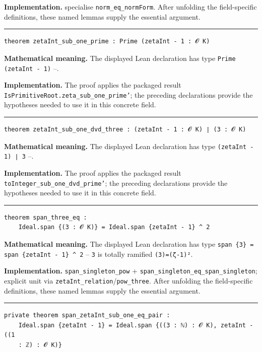 \documentclass[UTF8,a4paper,11pt,fontset=fandol]{ctexart}
\theoremstyle{definition}
\newcommand{\statementsep}{\par\medskip\hrule\medskip}
\begin{document}
\noindent\textbf{Implementation.} specialise \texttt{norm\_\allowbreak{}eq\_\allowbreak{}normForm}. After unfolding the field-specific definitions, these named lemmas supply the essential argument.\par
\statementsep
\begin{verbatim}
theorem zetaInt_sub_one_prime : Prime (zetaInt - 1 : 𝓞 K)
\end{verbatim}
\noindent\textbf{Mathematical meaning.} The displayed Lean declaration has type \texttt{Prime (zetaInt - 1)} --.\par
\noindent\textbf{Implementation.} The proof applies the packaged result \texttt{IsPrimitiveRoot.\allowbreak{}zeta\_\allowbreak{}sub\_\allowbreak{}one\_\allowbreak{}prime'}; the preceding declarations provide the hypotheses needed to use it in this concrete field.\par
\statementsep
\begin{verbatim}
theorem zetaInt_sub_one_dvd_three : (zetaInt - 1 : 𝓞 K) ∣ (3 : 𝓞 K)
\end{verbatim}
\noindent\textbf{Mathematical meaning.} The displayed Lean declaration has type \texttt{(zetaInt - 1) ∣ 3} --.\par
\noindent\textbf{Implementation.} The proof applies the packaged result \texttt{toInteger\_\allowbreak{}sub\_\allowbreak{}one\_\allowbreak{}dvd\_\allowbreak{}prime'}; the preceding declarations provide the hypotheses needed to use it in this concrete field.\par
\statementsep
\begin{verbatim}
theorem span_three_eq :
    Ideal.span {(3 : 𝓞 K)} = Ideal.span {zetaInt - 1} ^ 2
\end{verbatim}
\noindent\textbf{Mathematical meaning.} The displayed Lean declaration has type \texttt{span \{3\} = span \{zetaInt - 1\} \textasciicircum{} 2} -- \texttt{3} is totally ramified \texttt{(3)=(ζ-1)²}.\par
\noindent\textbf{Implementation.} \texttt{span\_\allowbreak{}singleton\_\allowbreak{}pow} + \texttt{span\_\allowbreak{}singleton\_\allowbreak{}eq\_\allowbreak{}span\_\allowbreak{}singleton}; explicit unit via \texttt{zetaInt\_\allowbreak{}relation}/\texttt{pow\_\allowbreak{}three}. After unfolding the field-specific definitions, these named lemmas supply the essential argument.\par
\statementsep
\begin{verbatim}
private theorem span_zetaInt_sub_one_eq_pair :
    Ideal.span {zetaInt - 1} = Ideal.span {((3 : ℕ) : 𝓞 K), zetaInt - ((1
    : ℤ) : 𝓞 K)}
\end{verbatim}
\end{document}
